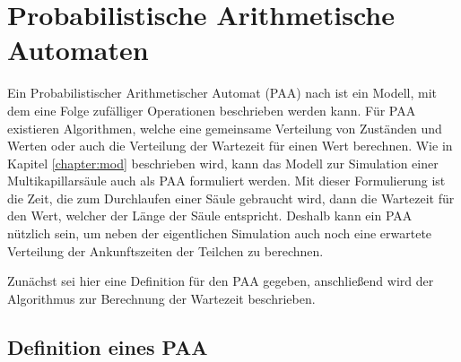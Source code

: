 \section{Probabilistische Arithmetische Automaten}
Ein Probabilistischer Arithmetischer Automat (PAA) nach \cite{MHKR} ist ein Modell, mit dem eine Folge zufälliger Operationen beschrieben werden kann. 
Für PAA existieren Algorithmen, welche eine gemeinsame Verteilung von Zuständen und Werten oder auch die Verteilung der Wartezeit für einen Wert berechnen. Wie in Kapitel \ref{chapter:mod} beschrieben wird, kann das Modell zur Simulation einer Multikapillarsäule auch als PAA formuliert werden. Mit dieser Formulierung ist die Zeit, die zum Durchlaufen einer Säule gebraucht wird, dann die Wartezeit für den Wert, welcher der Länge der Säule entspricht. Deshalb kann ein PAA nützlich sein, um neben der eigentlichen Simulation auch noch eine erwartete Verteilung der Ankunftszeiten der Teilchen zu berechnen. 

Zunächst sei hier eine Definition für den PAA gegeben, anschließend wird der Algorithmus zur Berechnung der Wartezeit beschrieben.


\subsection{Definition eines PAA}

